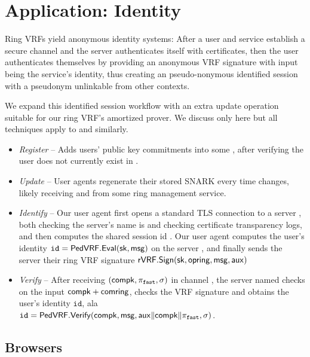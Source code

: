 \section{Application: Identity}
\label{sec:app_identity}

Ring VRFs yield anonymous identity systems:
After a user and service establish a secure channel and
the server authenticates itself with certificates, then
the user authenticates themselves by providing an anonymous
VRF signature with input \msg being the service's identity,
thus creating an pseudo-nonymous identified session with
a pseudonym unlinkable from other contexts.

We expand this identified session workflow with an extra
update operation suitable for our ring VRF's amortized prover.
We discuss only \pifast here but all techniques apply to \pisk and \pipk similarly. 

\begin{itemize}
\item {\em Register} --
 Adds users' public key commitments into some \ring,
 after verifying the user does not currently exist in \ring.
\item {\em Update} --
 User agents regenerate their stored SNARK \pifast every time \ring changes,
 likely receiving \comring and \openring from some ring management service.
\item {\em Identify} --
 Our user agent first opens a standard TLS connection to a server \msg,
 both checking the server's name is \msg and checking certificate
 transparency logs, and then computes the shared session id \aux.
 Our user agent computes the user's identity
  $\mathtt{id} = {\mathsf{PedVRF}}.{\mathsf{Eval}}(\mathsf{sk},\mathsf{msg})$ on the server \msg,
 and finally sends the server their ring VRF signature
 ${\mathsf{rVRF}}.{\mathsf{Sign}}(\mathsf{sk},\mathsf{opring},\mathsf{msg},\mathsf{aux})$ %
\item {\em Verify} -- 
 After receiving $(\mathsf{compk},\pi_{\mathtt{fast}},\sigma)$ in channel \aux,
 the server named \msg checks \pifast on the input $\mathsf{compk} + \mathsf{comring}$,
 checks the VRF signature and obtains the user's identity $\mathtt{id}$, ala \\
 $\mathtt{id} = {\mathsf{PedVRF}}.{\mathsf{Verify}}(\mathsf{compk},\mathsf{msg},\mathsf{aux} \| \mathsf{compk} \| \pi_{\mathtt{fast}},\sigma)$.
\end{itemize}


\subsection{Browsers}

